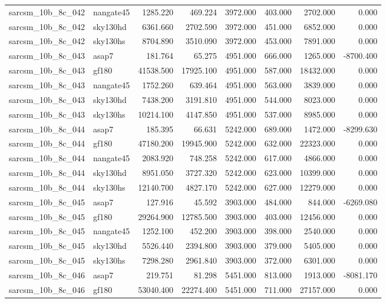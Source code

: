 \begin{tabular}{llrrrrrr}
sarcsm\_10b\_8c\_042 & nangate45 & 1285.220 & 469.224 & 3972.000 & 403.000 & 2702.000 & 0.000 \\
sarcsm\_10b\_8c\_042 & sky130hd & 6361.660 & 2702.590 & 3972.000 & 451.000 & 6852.000 & 0.000 \\
sarcsm\_10b\_8c\_042 & sky130hs & 8704.890 & 3510.090 & 3972.000 & 453.000 & 7891.000 & 0.000 \\
sarcsm\_10b\_8c\_043 & asap7 & 181.764 & 65.275 & 4951.000 & 666.000 & 1265.000 & -8700.400 \\
sarcsm\_10b\_8c\_043 & gf180 & 41538.500 & 17925.100 & 4951.000 & 587.000 & 18432.000 & 0.000 \\
sarcsm\_10b\_8c\_043 & nangate45 & 1752.260 & 639.464 & 4951.000 & 563.000 & 3839.000 & 0.000 \\
sarcsm\_10b\_8c\_043 & sky130hd & 7438.200 & 3191.810 & 4951.000 & 544.000 & 8023.000 & 0.000 \\
sarcsm\_10b\_8c\_043 & sky130hs & 10214.100 & 4147.850 & 4951.000 & 537.000 & 8985.000 & 0.000 \\
sarcsm\_10b\_8c\_044 & asap7 & 185.395 & 66.631 & 5242.000 & 689.000 & 1472.000 & -8299.630 \\
sarcsm\_10b\_8c\_044 & gf180 & 47180.200 & 19945.900 & 5242.000 & 632.000 & 22323.000 & 0.000 \\
sarcsm\_10b\_8c\_044 & nangate45 & 2083.920 & 748.258 & 5242.000 & 617.000 & 4866.000 & 0.000 \\
sarcsm\_10b\_8c\_044 & sky130hd & 8951.050 & 3727.320 & 5242.000 & 623.000 & 10399.000 & 0.000 \\
sarcsm\_10b\_8c\_044 & sky130hs & 12140.700 & 4827.170 & 5242.000 & 627.000 & 12279.000 & 0.000 \\
sarcsm\_10b\_8c\_045 & asap7 & 127.916 & 45.592 & 3903.000 & 484.000 & 844.000 & -6269.080 \\
sarcsm\_10b\_8c\_045 & gf180 & 29264.900 & 12785.500 & 3903.000 & 403.000 & 12456.000 & 0.000 \\
sarcsm\_10b\_8c\_045 & nangate45 & 1252.100 & 452.200 & 3903.000 & 398.000 & 2540.000 & 0.000 \\
sarcsm\_10b\_8c\_045 & sky130hd & 5526.440 & 2394.800 & 3903.000 & 379.000 & 5405.000 & 0.000 \\
sarcsm\_10b\_8c\_045 & sky130hs & 7298.280 & 2961.840 & 3903.000 & 372.000 & 6301.000 & 0.000 \\
sarcsm\_10b\_8c\_046 & asap7 & 219.751 & 81.298 & 5451.000 & 813.000 & 1913.000 & -8081.170 \\
sarcsm\_10b\_8c\_046 & gf180 & 53040.400 & 22274.400 & 5451.000 & 711.000 & 27157.000 & 0.000 \\

\end{tabular}
